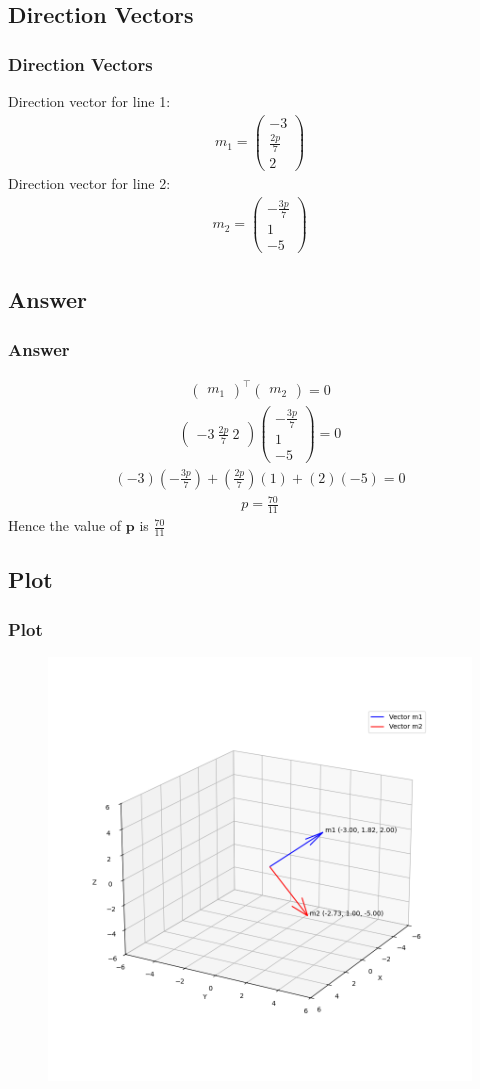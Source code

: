 \documentclass{beamer}
\theoremstyle{remark}
\newcommand{\myvec}[1]{\ensuremath{\begin{pmatrix}#1\end{pmatrix}}}
\let\vec\mathbf
\numberwithin{equation}{section}
\begin{document}
\subsection{Direction Vectors}
\begin{frame}
\frametitle{Direction Vectors}
Direction vector for line 1:
\begin{align}
m_1 = \myvec{-3 \\ \frac{2p}{7} \\ 2}
\end{align}
Direction vector for line 2:
\begin{align}
m_2 = \myvec{-\frac{3p}{7} \\ 1 \\ -5}
\end{align}
\end{frame}

\subsection{Answer}
\begin{frame}
\frametitle{Answer}
\begin{align}
\myvec{m_1}^\top\myvec{m_2} = 0 
\end{align}
\begin{align}
\myvec{-3 \ \frac{2p}{7} \ 2}\myvec{-\frac{3p}{7} \\ 1 \\ -5}=0  
\end{align}
\begin{align}
(-3)(-\frac{3p}{7}) + (\frac{2p}{7})(1) + (2)(-5) = 0  
\end{align}
\begin{align}
p = \frac{70}{11}
\end{align}
Hence the value of $\vec{p}$ is $\frac{70}{11}$
\end{frame}

\subsection{Plot}
\begin{frame}[fragile]
\frametitle{Plot}

\begin{figure}[h!]
   \centering
   \includegraphics[width=0.6\columnwidth]{figs/fig1.png}
	\caption{}
   \label{stemplot}
\end{figure}
\end{frame}
\end{document}

